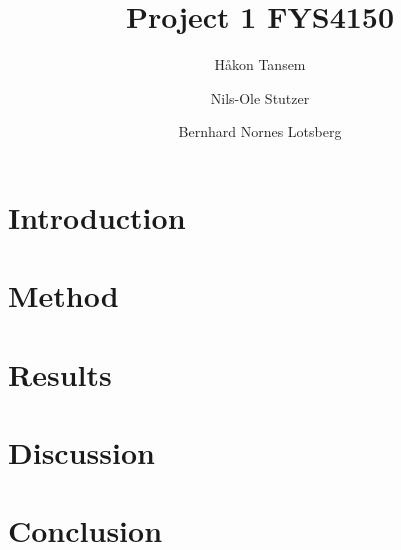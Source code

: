 \documentclass{aastex62}
\begin{document}
\title{Project 1 FYS4150}




\author{Håkon Tansem}

\author{Nils-Ole Stutzer}

\author{Bernhard Nornes Lotsberg}

\begin{abstract}

\end{abstract}

\section{Introduction} \label{sec:intro}

\section{Method} \label{sec:method}

\section{Results} \label{sec:results}

\section{Discussion} \label{sec:discussion}

\section{Conclusion} \label{sec:conclusion}

\
\begin{thebibliography}{}
\end{thebibliography}
\end{document}
